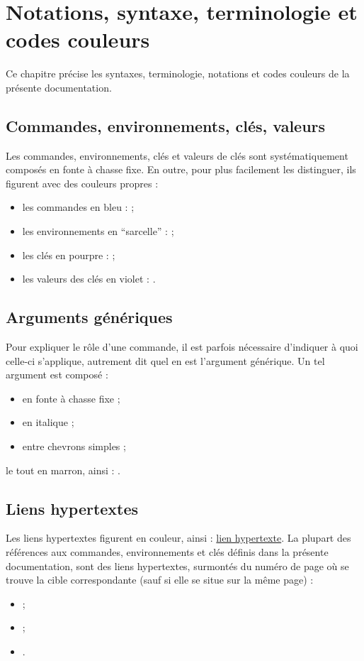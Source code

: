 
\chapter{Notations, syntaxe, terminologie et codes couleurs}\label{cha:synt-term-notat}

Ce chapitre précise les syntaxes, terminologie, notations et codes couleurs de
la présente documentation.


\section{Commandes, environnements, clés, valeurs}\label{sec:comm-envir-cles}

Les commandes, environnements, clés et valeurs de clés sont systématiquement
composés en fonte à chasse fixe. En outre, pour plus facilement les
distinguer, ils figurent avec des couleurs propres :
\begin{itemize}
\item les commandes en bleu :  ;
\item les environnements en \enquote{sarcelle} :
   ;
\item les clés en pourpre :  ;
\item les valeurs des clés en violet : .
\end{itemize}

\section{Arguments génériques}
\label{sec:arguments-generiques}

Pour expliquer le rôle d'une commande, il est parfois nécessaire d'indiquer
à quoi celle-ci s'applique, autrement dit quel en est l'argument générique.
Un tel argument est composé :
\begin{itemize}
\item en fonte à chasse fixe ;
\item en italique ;
\item entre chevrons simples ;
\end{itemize}
le tout en marron, ainsi : .

\section{Liens hypertextes}
\label{sec:liens-hypertextes}

Les liens hypertextes figurent en couleur, ainsi :
\href{http://gte.univ-littoral.fr/members/dbitouze/pub/latex}{lien hypertexte}.
La plupart des références aux commandes, environnements et clés définis dans la
présente documentation, sont des liens hypertextes, surmontés du numéro de page
où se trouve la cible correspondante (sauf si elle se situe sur la même page) :
\begin{itemize}
\item {} ;
\item {} ;
\item {}.
\end{itemize}


